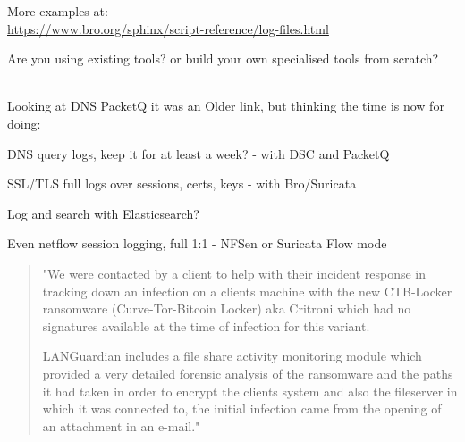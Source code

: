 \documentclass[20pt,landscape,a4paper,footrule]{foils}
\begin{document}
More examples at:\\
\url{https://www.bro.org/sphinx/script-reference/log-files.html}




Are you using existing tools? or build your own specialised tools from scratch?\\

{\footnotesize
{}\\
}



Looking at DNS PacketQ it was an Older link, but thinking the time is now for doing:

\begin{list2}
\item DNS query logs, keep it for at least a week? - with DSC and PacketQ
\item SSL/TLS full logs over sessions, certs, keys - with Bro/Suricata\\
\item Log and search with Elasticsearch?\\
\item Even netflow session logging, full 1:1 - NFSen or Suricata Flow mode
\end{list2}



\begin{quote}
"We were contacted by a client to help with their incident response in tracking down an
infection on a clients machine with the new CTB-Locker ransomware (Curve-Tor-Bitcoin Locker)
aka Critroni which had no signatures available at the time of infection for this variant.

LANGuardian includes a file share activity monitoring module which provided a very
detailed forensic analysis of the ransomware and the paths it had taken in order to
encrypt the clients system and also the fileserver in which it was connected to, the
initial infection came from the opening of an attachment in an e-mail."
\end{quote}
\end{document}
